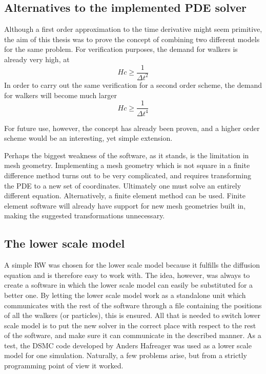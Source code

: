 \subsection{Alternatives to the implemented PDE solver}
Although a first order approximation to the time derivative might seem primitive, the aim of this thesis was to prove the concept of combining two different models for the same problem. 
For verification purposes, the demand for walkers is already very high, at
\begin{equation*}
 Hc \geq \frac{1}{\Delta t^2}
\end{equation*}
In order to carry out the same verification for a second order scheme, the demand for walkers will become much larger
\begin{equation*}
 Hc \geq \frac{1}{\Delta t^4}
\end{equation*}

For future use, however, the concept has already been proven, and a higher order scheme would be an interesting, yet simple extension.

Perhaps the biggest weakness of the software, as it stands, is the limitation in mesh geometry. 
Implementing a mesh geometry which is not square in a finite difference method turns out to be very complicated, and requires transforming the PDE to a new set of coordinates. 
Ultimately one must solve an entirely different equation. 
Alternatively, a finite element method can be used. 
Finite element software will already have support for new mesh geometries built in, making the suggested transformations unnecessary.

\subsection{The lower scale model}

A simple RW was chosen for the lower scale model because it fulfills the diffusion equation and is therefore easy to work with. 
The idea, however, was always to create a software in which the lower scale model can easily be substituted for a better one. 
By letting the lower scale model work as a standalone unit which communicates with the rest of the software through a file containing the positions of all the walkers (or particles), this is ensured. 
All that is needed to switch lower scale model is to put the new solver in the correct place with respect to the rest of the software, and make sure it can communicate in the described manner. 
As a test, the DSMC code developed by Anders Hafreager was used as a lower scale model for one simulation. 
Naturally, a few problems arise, but from a strictly programming point of view it worked. \\

